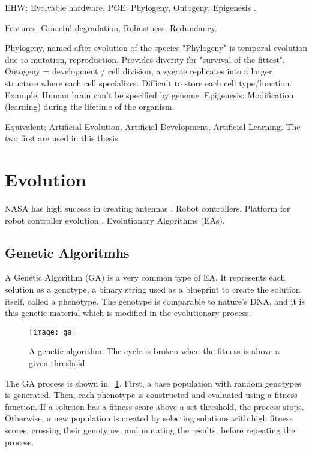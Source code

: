 \TODO
EHW: Evolvable hardware.
POE: Phylogeny, Ontogeny, Epigenesis \cite{sipper1997poe}.

Features: Graceful degradation, Robustness, Redundancy.

\TODO
Phylogeny, named after evolution of the species "Phylogeny" is temporal evolution due to mutation, reproduction.
Provides diverity for "survival of the fittest".
Ontogeny = development / cell division, a zygote replicates into a larger structure where each cell specializes.
Difficult to store each cell type/function.
Example: Human brain can't be specified by genome.
Epigenesis: Modification (learning) during the lifetime of the organism.

\TODO
Equivalent: Artificial Evolution, Artificial Development, Artificial Learning.
The two first are used in this thesis.


\section{Evolution}

\TODO
NASA has high success in creating antennas \cite{hornby2006antenna}.
Robot controllers.
Platform for robot controller evolution \cite{haddow1999robot}.
Evolutionary Algorithms (EAs).

\subsection{Genetic Algoritmhs}

A Genetic Algorithm (GA) is a very common type of EA.
It represents each solution as a genotype, a binary string used as a blueprint to create the solution itself, called a phenotype.
The genotype is comparable to nature's DNA, and it is this genetic material which is modified in the evolutionary process.

\begin{figure}[!ht]
    \centering
    \texttt{[image: ga]}
    \caption[Genetic Algorithm]{
        A genetic algorithm.
        The cycle is broken when the fitness is above a given threshold.
    }
    \label{fig:ga}
\end{figure}

The GA process is shown in \figurename~\ref{fig:ga}.
First, a base population with random genotypes is generated.
Then, each phenotype is constructed and evaluated using a fitness function.
If a solution has a fitness score above a set threshold, the process stops.
Otherwise, a new population is created by selecting solutions with high fitness scores, crossing their genotypes, and mutating the results, before repeating the process.

